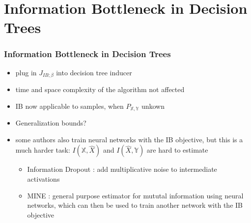 \section[IB in Trees]{Information Bottleneck in Decision Trees} %

\begin{frame}
\frametitle{Information Bottleneck in Decision Trees}
    \begin{itemize}
        \item plug in $J_{IB;\beta}$ into decision tree inducer
        \item time and space complexity of the algorithm not affected
        \item IB now applicable to samples, when $P_{\mathbb{X}, \mathbb{Y}}$ unkown
        \item Generalization bounds?
        \item some authors also train neural networks with the IB objective, but this is a much harder task: $I(\mathbb{X}, \hat{X})$ and $I(\hat{X}, \mathbb{Y})$ are hard to estimate
        \begin{itemize}
            \item Information Dropout \cite{achille_information_2017}: add multiplicative noise to intermediate activations
            \item MINE \cite{belghazi_mine_2018}: general purpose estimator for mututal information using neural networks, which can then be used to train another network with the IB objective
        \end{itemize}
    \end{itemize}


\end{frame}
